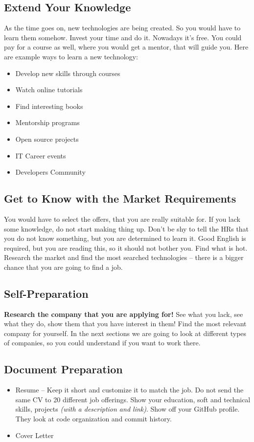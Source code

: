 \subsection{Extend Your Knowledge}
As the time goes on, new technologies are being created. So you would have to learn them somehow. Invest your time and do it. Nowadays it's free. You could pay for a course as well, where you would get a mentor, that will guide you. Here are example ways to learn a new technology:
\begin{itemize}
    \item Develop new skills through courses
    \item Watch online tutorials
    \item Find interesting books
    \item Mentorship programs
    \item Open source projects
    \item IT Career events
    \item Developers Community
\end{itemize}
\subsection{Get to Know with the Market Requirements}
You would have to select the offers, that you are really suitable for. If you lack some knowledge, do not start making thing up. Don't be shy to tell the HRs that you do not know something, but you are determined to learn it. Good English is required, but you are reading this, so it should not bother you. 
Find what is hot. Research the market and find the most searched technologies -- there is a bigger chance that you are going to find a job.
\subsection{Self-Preparation}
\textbf{Research the company that you are applying for!} See what you lack, see what they do, show them that you have interest in them! Find the most relevant company for yourself. In the next sections we are going to look at different types of companies, so you could understand if you want to work there.
\subsection{Document Preparation}
\begin{itemize}
    \item Resume -- Keep it short and customize it to match the job. Do not send the same CV to 20 different job offerings. Show your education, soft and technical skills, projects \textit{(with a description and link)}. Show off your GitHub profile. They look at code organization and commit history.
    \item Cover Letter
\end{itemize}
